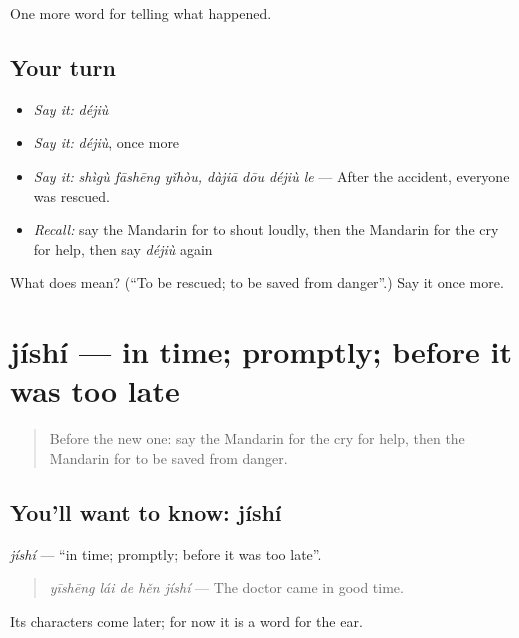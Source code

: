\begin{grammarlens}[title={What you've built}]
One more word for telling what happened.
\end{grammarlens}

\subsection*{Your turn}
\begin{itemize}
\raggedright
  \item \emph{Say it:} \emph{déjiù}
  \item \emph{Say it:} \emph{déjiù}, once more
  \item \emph{Say it:} \emph{shìgù fāshēng yǐhòu, dàjiā dōu déjiù le} — After the accident, everyone was rescued.
  \item \emph{Recall:} say the Mandarin for to shout loudly, then the Mandarin for the cry for help, then say \emph{déjiù} again
\end{itemize}

\begin{tcolorbox}[breakable,colback=teal!4,colframe=teal!35!black,title={Before you move on}]
What does  mean? (\textquotedblleft{}To be rescued; to be saved from danger\textquotedblright{}.) Say it once more.
\end{tcolorbox}
\section[jíshí]{jíshí — in time; promptly; before it was too late}

\label{lesson:ZH-C299-jishi}



\begin{quote}
Before the new one: say the Mandarin for the cry for help, then the Mandarin for to be saved from danger.
\end{quote}

\subsection*{You'll want to know: jíshí}
\emph{jíshí} — \textquotedblleft{}in time; promptly; before it was too late\textquotedblright{}.

\begin{quote}
\emph{yīshēng lái de hěn jíshí} — The doctor came in good time.
\end{quote}

Its characters come later; for now it is a word for the ear.

